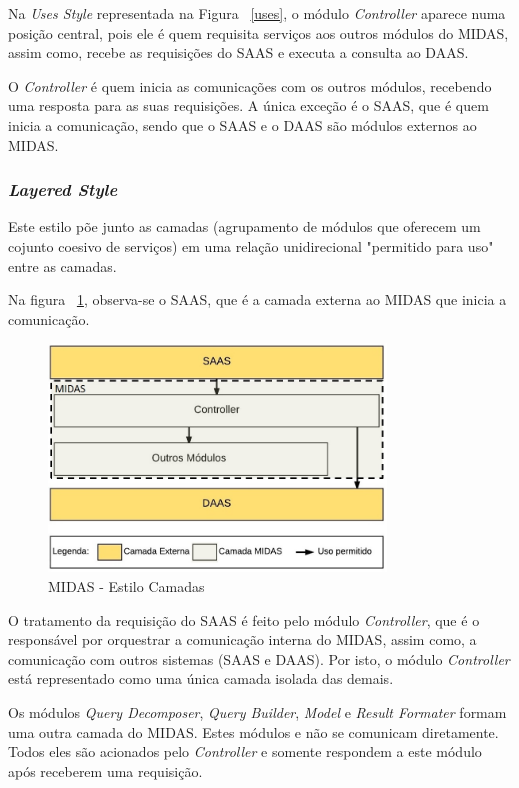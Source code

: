 \documentclass[11pt,a4paper]{article}
\begin{document}
Na \textit{Uses Style} representada na Figura ~\ref{uses}, o módulo \textit{Controller} aparece numa posição central, pois ele é quem requisita serviços aos outros módulos do MIDAS, assim como, recebe as requisições do SAAS e executa a consulta ao DAAS. 

O \textit{Controller} é quem inicia as comunicações com os outros módulos, recebendo uma resposta para as suas requisições. A única exceção é o SAAS, que é quem inicia a comunicação, sendo que o SAAS e o DAAS são módulos externos ao MIDAS. 


\subsubsection{\textit{Layered Style}}

Este estilo põe junto as camadas (agrupamento de módulos que oferecem um cojunto coesivo de serviços) em uma relação unidirecional "permitido para uso" entre as camadas.

Na figura ~\ref{camadas}, observa-se o SAAS, que é a camada externa ao MIDAS que inicia a comunicação. 

\begin{figure} [h!]
  \centering
    \includegraphics[width=0.8\textwidth]{MIDAS_-_Estilo_Camada}
  \caption{MIDAS - Estilo Camadas}
  \label{camadas}
\end{figure}

O tratamento da requisição do SAAS é feito pelo módulo \textit{Controller}, que é o responsável por orquestrar a comunicação interna do MIDAS, assim como, a comunicação com outros sistemas (SAAS e DAAS). Por isto, o módulo \textit{Controller} está representado como uma única camada isolada das demais. 

Os módulos \textit{Query Decomposer}, \textit{Query Builder}, \textit{Model} e \textit{Result Formater} formam uma outra camada do MIDAS. Estes módulos e não se comunicam diretamente. Todos eles são acionados pelo \textit{Controller} e somente respondem a este módulo após receberem uma requisição. 
\end{document}
